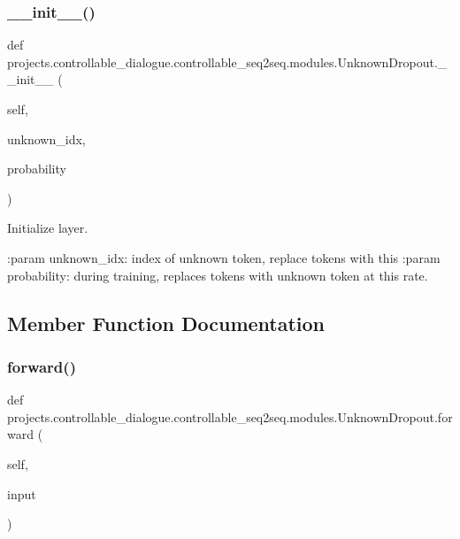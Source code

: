 \subsubsection{\texorpdfstring{\+\_\+\+\_\+init\+\_\+\+\_\+()}{\_\_init\_\_()}}
{\footnotesize\ttfamily def projects.\+controllable\+\_\+dialogue.\+controllable\+\_\+seq2seq.\+modules.\+Unknown\+Dropout.\+\_\+\+\_\+init\+\_\+\+\_\+ (\begin{DoxyParamCaption}\item[{}]{self,  }\item[{}]{unknown\+\_\+idx,  }\item[{}]{probability }\end{DoxyParamCaption})}

\begin{DoxyVerb}Initialize layer.

:param unknown_idx: index of unknown token, replace tokens with this
:param probability: during training, replaces tokens with unknown token
            at this rate.
\end{DoxyVerb}
 

\subsection{Member Function Documentation}
\mbox{\label{classprojects_1_1controllable__dialogue_1_1controllable__seq2seq_1_1modules_1_1UnknownDropout_aff3bc451d1729384ba040a0ea1e5443c}} 
\subsubsection{\texorpdfstring{forward()}{forward()}}
{\footnotesize\ttfamily def projects.\+controllable\+\_\+dialogue.\+controllable\+\_\+seq2seq.\+modules.\+Unknown\+Dropout.\+forward (\begin{DoxyParamCaption}\item[{}]{self,  }\item[{}]{input }\end{DoxyParamCaption})}

